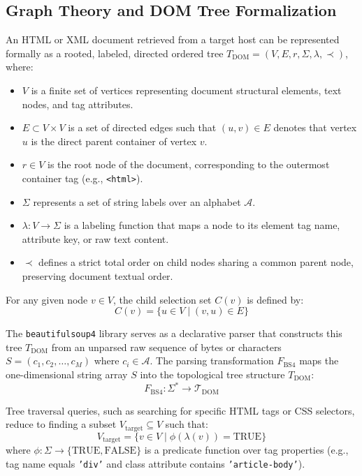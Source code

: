 \documentclass{article}
\begin{document}
\subsection{Graph Theory and DOM Tree Formalization}
An HTML or XML document retrieved from a target host can be represented formally as a rooted, labeled, directed ordered tree $T_{\text{DOM}} = (V, E, r, \Sigma, \lambda, \prec)$, where:
\begin{itemize}
    \item $V$ is a finite set of vertices representing document structural elements, text nodes, and tag attributes.
    \item $E \subset V \times V$ is a set of directed edges such that $(u, v) \in E$ denotes that vertex $u$ is the direct parent container of vertex $v$.
    \item $r \in V$ is the root node of the document, corresponding to the outermost container tag (e.g., \texttt{<html>}).
    \item $\Sigma$ represents a set of string labels over an alphabet $\mathcal{A}$.
    \item $\lambda: V \to \Sigma$ is a labeling function that maps a node to its element tag name, attribute key, or raw text content.
    \item $\prec$ defines a strict total order on child nodes sharing a common parent node, preserving document textual order.
\end{itemize}

For any given node $v \in V$, the child selection set $C(v)$ is defined by:
\begin{equation}
C(v) = \{ u \in V \mid (v, u) \in E \}
\end{equation}

The \texttt{beautifulsoup4} library serves as a declarative parser that constructs this tree $T_{\text{DOM}}$ from an unparsed raw sequence of bytes or characters $S = (c_1, c_2, \dots, c_M)$ where $c_i \in \mathcal{A}$. The parsing transformation $F_{\text{BS4}}$ maps the one-dimensional string array $S$ into the topological tree structure $T_{\text{DOM}}$:
\begin{equation}
F_{\text{BS4}}: \Sigma^* \to \mathcal{T}_{\text{DOM}}
\end{equation}

Tree traversal queries, such as searching for specific HTML tags or CSS selectors, reduce to finding a subset $V_{\text{target}} \subseteq V$ such that:
\begin{equation}
V_{\text{target}} = \{ v \in V \mid \phi(\lambda(v)) = \text{TRUE} \}
\end{equation}
where $\phi: \Sigma \to \{\text{TRUE}, \text{FALSE}\}$ is a predicate function over tag properties (e.g., tag name equals \texttt{'div'} and class attribute contains \texttt{'article-body'}).
\end{document}

